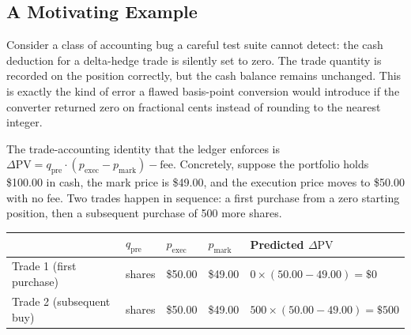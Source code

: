 \documentclass[
  11pt,
  letterpaper,
  DIV=12,
  numbers=noendperiod]{scrartcl}
\numberwithin{equation}{section}
\numberwithin{figure}{section}
\numberwithin{table}{section}
\begin{document}
\subsection{A Motivating Example}\label{sec-falsification}

Consider a class of accounting bug a careful test suite cannot detect:
the cash deduction for a delta-hedge trade is silently set to zero. The
trade quantity is recorded on the position correctly, but the cash
balance remains unchanged. This is exactly the kind of error a flawed
basis-point conversion would introduce if the converter returned zero on
fractional cents instead of rounding to the nearest integer.

The trade-accounting identity that the ledger enforces is
\(\Delta\text{PV} = q_{\text{pre}} \cdot (p_{\text{exec}} -
p_{\text{mark}}) - \text{fee}\). Concretely, suppose the portfolio holds
\$100.00 in cash, the mark price is \$49.00, and the execution price
moves to \$50.00 with no fee. Two trades happen in sequence: a first
purchase from a zero starting position, then a subsequent purchase of
500 more shares.

\begin{longtable}[]{@{}
  >{\raggedright\arraybackslash}p{}
  >{\raggedright\arraybackslash}p{}
  >{\raggedright\arraybackslash}p{}
  >{\raggedright\arraybackslash}p{}
  >{\raggedright\arraybackslash}p{}@{}}
\toprule\noalign{}
\begin{minipage}[b]{\linewidth}\raggedright
\end{minipage} & \begin{minipage}[b]{\linewidth}\raggedright
\(q_{\text{pre}}\)
\end{minipage} & \begin{minipage}[b]{\linewidth}\raggedright
\(p_{\text{exec}}\)
\end{minipage} & \begin{minipage}[b]{\linewidth}\raggedright
\(p_{\text{mark}}\)
\end{minipage} & \begin{minipage}[b]{\linewidth}\raggedright
Predicted \(\Delta\text{PV}\)
\end{minipage} \\
\midrule\noalign{}
\endhead
\bottomrule\noalign{}
\endlastfoot
Trade 1 (first purchase) & 0 shares & \$50.00 & \$49.00 &
\(0 \times (50.00 - 49.00) = \$0\) \\
Trade 2 (subsequent buy) & 500 shares & \$50.00 & \$49.00 &
\(500 \times (50.00 - 49.00) = \$500\) \\
\end{longtable}
\end{document}

